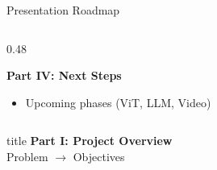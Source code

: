 \documentclass[aspectratio=169,xcolor=dvipsnames]{beamer}
\begin{document}
\begin{frame}{Presentation Roadmap}
\begin{columns}[t]
\begin{column}{0.48\textwidth}
            \vspace{0.3em}

            \begin{block}{\textbf{Part IV: Next Steps}}
                \begin{itemize}
                    \item Upcoming phases (ViT, LLM, Video)
                \end{itemize}
            \end{block}
        \end{column}
    \end{columns}
\end{frame}

\begin{frame}[plain]
    \centering
    \vfill
    \begin{beamercolorbox}[center,shadow=true,rounded=true]{title}
        \textbf{Part I: Project Overview}\\
        \vspace{0.5em}
        \large Problem $\to$ Objectives
    \end{beamercolorbox}
    \vfill
\end{frame}
\end{document}
